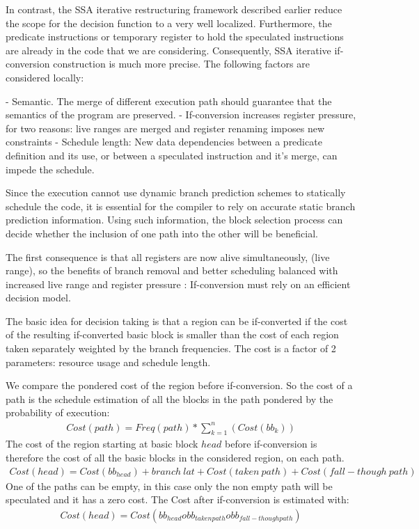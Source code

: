 In contrast, the SSA iterative restructuring framework described earlier reduce the scope for the decision function to a very well localized. Furthermore, the predicate instructions or temporary register to hold the speculated instructions are already in the code that we are considering. Consequently, SSA iterative if-conversion construction is much more precise. The following factors are considered locally: 

- Semantic. The merge of different execution path should guarantee that the semantics of the program are preserved.
- If-conversion increases register pressure, for two reasons: live ranges are merged and register renaming imposes new constraints
- Schedule length: New data dependencies between a predicate definition and its use, or between a speculated instruction and it's merge, can impede the schedule.

Since the execution cannot use dynamic branch prediction schemes to statically schedule the code, it is essential for the compiler to rely on accurate static branch prediction information. Using such information, the block selection process can decide whether the inclusion of one path into the other will be beneficial. 

The first consequence is that all registers are now alive simultaneously, (live range), so the benefits of branch removal and better scheduling balanced with increased live range and register pressure : If-conversion must rely on an efficient decision model.

The basic idea for decision taking is that a region can be if-converted if the cost of the resulting if-converted basic block is smaller than the cost of each region taken separately weighted by the branch frequencies. The cost is a factor of 2 parameters: resource usage and schedule length.

We compare the pondered cost of the region before if-conversion. So the cost of a path is the schedule estimation of all the blocks in the path pondered by the probability of execution:
\begin{align}
Cost(path)=Freq(path)*\sum_{k=1}^n(Cost(bb_{k}))
\end{align}
The cost of the region starting at basic block $head$ before if-conversion is therefore the cost of all the basic blocks in the considered region, on each path.
\begin{align}
Cost(head)=Cost(bb_{head})+branch\:lat+Cost(taken\:path)+Cost(fall-though\:path)
\end{align}
One of the paths can be empty, in this case only the non empty path will be speculated and it has a zero cost. The Cost after if-conversion is estimated with:
\begin{align}
Cost(head)=Cost(bb_{head} o bb_{taken path} o bb_{fall-though path})
\end{align}

